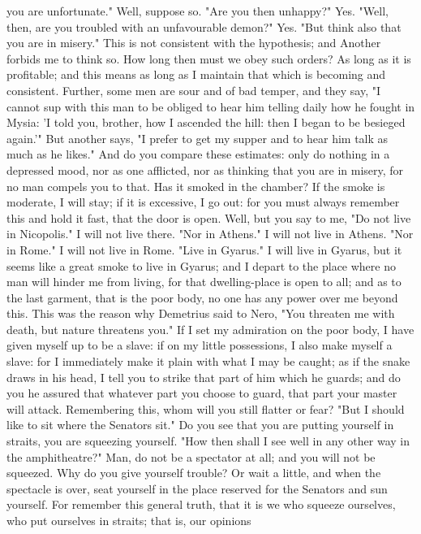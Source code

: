 \documentclass[a4paper]{article}
\begin{document}
you are unfortunate." Well, suppose so. "Are you then unhappy?" Yes. "Well,
then, are you troubled with an unfavourable demon?" Yes. "But think also that
you are in misery." This is not consistent with the hypothesis; and Another
forbids me to think so.
    How long then must we obey such orders? As long as it is profitable; and
this means as long as I maintain that which is becoming and consistent.
Further, some men are sour and of bad temper, and they say, "I cannot sup with
this man to be obliged to hear him telling daily how he fought in Mysia: 'I
told you, brother, how I ascended the hill: then I began to be besieged
again.'" But another says, "I prefer to get my supper and to hear him talk as
much as he likes." And do you compare these estimates: only do nothing in a
depressed mood, nor as one afflicted, nor as thinking that you are in misery,
for no man compels you to that. Has it smoked in the chamber? If the smoke is
moderate, I will stay; if it is excessive, I go out: for you must always
remember this and hold it fast, that the door is open. Well, but you say to me,
"Do not live in Nicopolis." I will not live there. "Nor in Athens." I will not
live in Athens. "Nor in Rome." I will not live in Rome. "Live in Gyarus." I
will live in Gyarus, but it seems like a great smoke to live in Gyarus; and I
depart to the place where no man will hinder me from living, for that
dwelling-place is open to all; and as to the last garment, that is the poor
body, no one has any power over me beyond this. This was the reason why
Demetrius said to Nero, "You threaten me with death, but nature threatens you."
If I set my admiration on the poor body, I have given myself up to be a slave:
if on my little possessions, I also make myself a slave: for I immediately make
it plain with what I may be caught; as if the snake draws in his head, I tell
you to strike that part of him which he guards; and do you he assured that
whatever part you choose to guard, that part your master will attack.
Remembering this, whom will you still flatter or fear?
    "But I should like to sit where the Senators sit." Do you see that you are
putting yourself in straits, you are squeezing yourself. "How then shall I see
well in any other way in the amphitheatre?" Man, do not be a spectator at all;
and you will not be squeezed. Why do you give yourself trouble? Or wait a
little, and when the spectacle is over, seat yourself in the place reserved for
the Senators and sun yourself. For remember this general truth, that it is we
who squeeze ourselves, who put ourselves in straits; that is, our opinions
\end{document}
